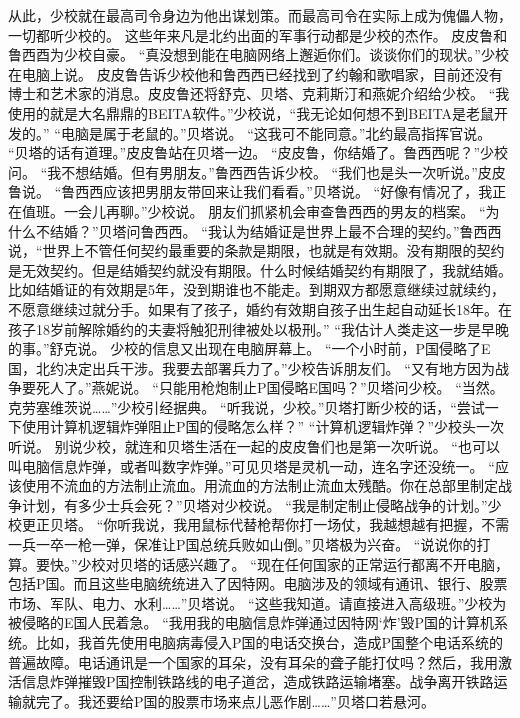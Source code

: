 \documentclass[a4paper,12pt,UTF8,twoside]{ctexbook}
\begin{document}
        从此，少校就在最高司令身边为他出谋划策。而最高司令在实际上成为傀儡人物，一切都听少校的。  
        这些年来凡是北约出面的军事行动都是少校的杰作。  
        皮皮鲁和鲁西酉为少校自豪。  
        “真没想到能在电脑网络上邂逅你们。谈谈你们的现状。”少校在电脑上说。  
        皮皮鲁告诉少校他和鲁西西已经找到了约翰和歌唱家，目前还没有博士和艺术家的消息。皮皮鲁还将舒克、贝塔、克莉斯汀和燕妮介绍给少校。  
        “我使用的就是大名鼎鼎的BEITA软件。”少校说，“我无论如何想不到BEITA是老鼠开发的。”  
        “电脑是属于老鼠的。”贝塔说。  
        “这我可不能同意。”北约最高指挥官说。  
        “贝塔的话有道理。”皮皮鲁站在贝塔一边。  
        “皮皮鲁，你结婚了。鲁西西呢？”少校问。  
        “我不想结婚。但有男朋友。”鲁西西告诉少校。  
        “我们也是头一次听说。”皮皮鲁说。        
        “鲁西西应该把男朋友带回来让我们看看。”贝塔说。  
        “好像有情况了，我正在值班。一会儿再聊。”少校说。  
        朋友们抓紧机会审查鲁西西的男友的档案。  
        “为什么不结婚？”贝塔问鲁西西。  
        “我认为结婚证是世界上最不合理的契约。”鲁西西说，“世界上不管任何契约最重要的条款是期限，也就是有效期。没有期限的契约是无效契约。但是结婚契约就没有期限。什么时候结婚契约有期限了，我就结婚。比如结婚证的有效期是5年，没到期谁也不能走。到期双方都愿意继续过就续约，不愿意继续过就分手。如果有了孩子，婚约有效期自孩子出生起自动延长18年。在孩子18岁前解除婚约的夫妻将触犯刑律被处以极刑。”  
        “我估计人类走这一步是早晚的事。”舒克说。  
        少校的信息又出现在电脑屏幕上。  
        “一个小时前，P国侵略了E国，北约决定出兵干涉。我要去部署兵力了。”少校告诉朋友们。  
        “又有地方因为战争要死人了。”燕妮说。  
        “只能用枪炮制止P国侵略E国吗？”贝塔问少校。  
        “当然。克劳塞维茨说……”少校引经据典。  
        “听我说，少校。”贝塔打断少校的话，“尝试一下使用计算机逻辑炸弹阻止P国的侵略怎么样？”  
        “计算机逻辑炸弹？”少校头一次听说。  
        别说少校，就连和贝塔生活在一起的皮皮鲁们也是第一次听说。  
        “也可以叫电脑信息炸弹，或者叫数字炸弹。”可见贝塔是灵机一动，连名字还没统一。  
        “应该使用不流血的方法制止流血。用流血的方法制止流血太残酷。你在总部里制定战争计划，有多少士兵会死？”贝塔对少校说。  
        “我是制定制止侵略战争的计划。”少校更正贝塔。  
        “你听我说，我用鼠标代替枪帮你打一场仗，我越想越有把握，不需一兵一卒一枪一弹，保准让P国总统兵败如山倒。”贝塔极为兴奋。  
        “说说你的打算。要快。”少校对贝塔的话感兴趣了。  
        “现在任何国家的正常运行都离不开电脑，包括P国。而且这些电脑统统进入了因特网。电脑涉及的领域有通讯、银行、股票市场、军队、电力、水利……”贝塔说。  
        “这些我知道。请直接进入高级班。”少校为被侵略的E国人民着急。  
        “我用我的电脑信息炸弹通过因特网‘炸’毁P国的计算机系统。比如，我首先使用电脑病毒侵入P国的电话交换台，造成P国整个电话系统的普遍故障。电话通讯是一个国家的耳朵，没有耳朵的聋子能打仗吗？然后，我用激活信息炸弹摧毁P国控制铁路线的电子道岔，造成铁路运输堵塞。战争离开铁路运输就完了。我还要给P国的股票市场来点儿恶作剧……”贝塔口若悬河。  
\end{document}
